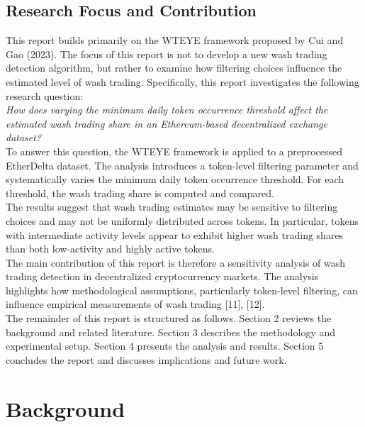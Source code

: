 \documentclass[language=english,thesis=bachelor,nosecondtitle,faculty=cb,onesided,12pt]{hsmw-thesis}
\begin{document}
	\section{Research Focus and Contribution}
This report builds primarily on the WTEYE framework proposed by Cui and Gao (2023). The focus of this report is not to develop a new wash trading detection algorithm, but rather to examine how filtering choices influence the estimated level of wash trading.
Specifically, this report investigates the following research question: \\
\textit{How does varying the minimum daily token occurrence threshold affect the estimated wash trading share in an Ethereum-based decentralized exchange dataset?} \\
To answer this question, the WTEYE framework is applied to a preprocessed EtherDelta dataset. The analysis introduces a token-level filtering parameter and systematically varies the minimum daily token occurrence threshold. For each threshold, the wash trading share is computed and compared. \\
The results suggest that wash trading estimates may be sensitive to filtering choices and may not be uniformly distributed across tokens. In particular, tokens with intermediate activity levels appear to exhibit higher wash trading shares than both low-activity and highly active tokens. \\
The main contribution of this report is therefore a sensitivity analysis of wash trading detection in decentralized cryptocurrency markets. The analysis highlights how methodological assumptions, particularly token-level filtering, can influence empirical measurements of wash trading [11], [12]. \\
\newline
The remainder of this report is structured as follows. Section 2 reviews the background and related literature. Section 3 describes the methodology and experimental setup. Section 4 presents the analysis and results. Section 5 concludes the report and discusses implications and future work.





\chapter{Background}
\end{document}
